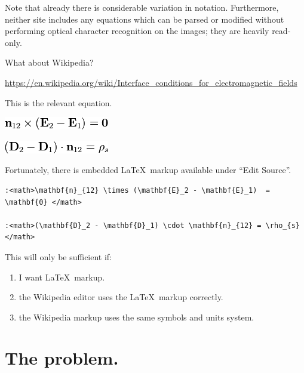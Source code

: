 \documentclass[12pt,letterpaper]{article}
\begin{document}
Note that already there is considerable variation in notation. Furthermore, neither site includes any equations which can be parsed or modified without performing optical character recognition on the images; they are heavily read-only.

What about Wikipedia?

\url{https://en.wikipedia.org/wiki/Interface_conditions_for_electromagnetic_fields}

This is the relevant equation.

\begin{center}
\includegraphics[scale=0.5]{wikipedia1.png}

\includegraphics[scale=0.5]{wikipedia2.png}
\end{center}

Fortunately, there is embedded \LaTeX\ markup available under ``Edit Source''.

\begin{verbatim}
:<math>\mathbf{n}_{12} \times (\mathbf{E}_2 - \mathbf{E}_1)  = \mathbf{0} </math>

:<math>(\mathbf{D}_2 - \mathbf{D}_1) \cdot \mathbf{n}_{12} = \rho_{s} </math>
\end{verbatim}

This will only be sufficient if:
\begin{enumerate}
\item I want \LaTeX\ markup.
\item the Wikipedia editor uses the \LaTeX\ markup correctly.
\item the Wikipedia markup uses the same symbols and units system.
\end{enumerate}

\section{The problem.}
\end{document}
